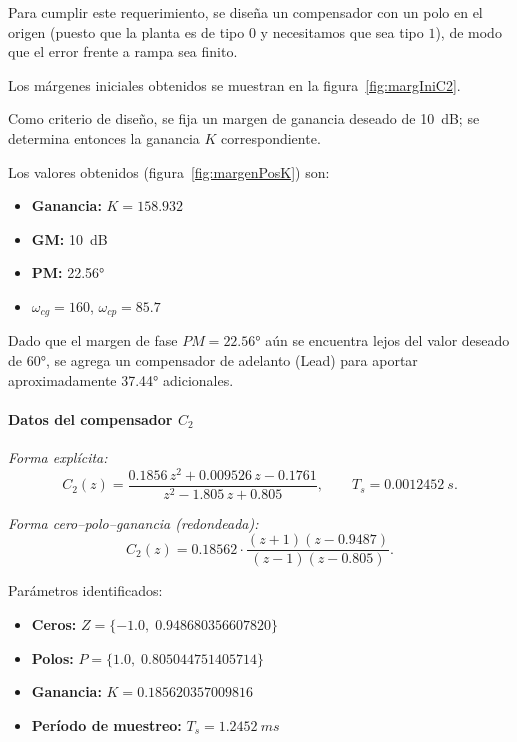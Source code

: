 Para cumplir este requerimiento, se diseña un compensador con un polo en el origen (puesto que la planta es de tipo $0$ y necesitamos que sea tipo $1$), de modo que el error frente a rampa sea finito.  

Los márgenes iniciales obtenidos se muestran en la figura~\ref{fig:margIniC2}.  


Como criterio de diseño, se fija un margen de ganancia deseado de \SI{10}{dB}; se determina entonces la ganancia $K$ correspondiente.


Los valores obtenidos (figura~\ref{fig:margenPosK}) son:
\begin{itemize}
	\item \textbf{Ganancia:} $K = 158.932$
	\item \textbf{GM:} \SI{10}{dB}
	\item \textbf{PM:} \ang{22.56}
	\item $\omega_{cg} = 160$, \quad $\omega_{cp} = 85.7$
\end{itemize}

Dado que el margen de fase $PM = \ang{22.56}$ aún se encuentra lejos del valor deseado de \ang{60}, se agrega un compensador de adelanto (Lead) para aportar aproximadamente \ang{37.44} adicionales.


\paragraph{Datos del compensador $C_2$}  

\textit{Forma explícita:}
\[
C_2(z) = \frac{0.1856\,z^2 + 0.009526\,z - 0.1761}{z^2 - 1.805\,z + 0.805}, 
\qquad
T_s = \SI{0.0012452}{s}.
\]

\textit{Forma cero–polo–ganancia (redondeada):}
\[
C_2(z) = 0.18562 \cdot \frac{(z+1)(z-0.9487)}{(z-1)(z-0.805)}.
\]

Parámetros identificados:
\begin{itemize}
	\item \textbf{Ceros:} $Z = \{-1.0,\; 0.948680356607820\}$
	\item \textbf{Polos:} $P = \{1.0,\; 0.805044751405714\}$
	\item \textbf{Ganancia:} $K = 0.185620357009816$
	\item \textbf{Período de muestreo:} $T_s = \SI{1.2452}{ms}$
\end{itemize}


